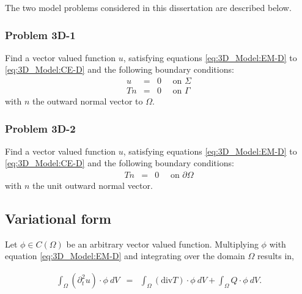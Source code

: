 \documentclass[../../main.tex]{subfiles}ite{VS18}
\begin{document}
The two model problems considered in this dissertation are described below.

\subsubsection{Problem 3D-1}\label{sssec:3D_Model:Problem3D1}
Find a vector valued function $u$, satisfying equations
\eqref{eq:3D_Model:EM-D} to \eqref{eq:3D_Model:CE-D} and the following boundary
conditions:\\

\begin{eqnarray*}
	u & = & 0 \quad \textrm{ on } \Sigma\\
	Tn & = & 0 \quad \textrm{ on } \Gamma
\end{eqnarray*} with $n$ the outward normal vector to $\Omega$.

\subsubsection{Problem 3D-2}\label{sssec:3D_Model:Problem3D2}
Find a vector valued function $u$, satisfying equations
\eqref{eq:3D_Model:EM-D} to \eqref{eq:3D_Model:CE-D} and the following boundary
conditions:\\

\begin{eqnarray*}
	Tn & = & 0 \quad \textrm{ on } \partial\Omega
\end{eqnarray*} with $n$ the unit outward normal vector. \label{sym:boundaryOmega}

\subsection{Variational form}\label{ssec:3D_Model:VariationalForm}
Let $\phi \in C({\Omega})$ be an arbitrary vector valued function. Multiplying
$\phi$ with equation \eqref{eq:3D_Model:EM-D} and integrating over the domain
$\Omega$ results in, \label{sym:Cn} \label{sym:phi}

\begin{eqnarray*}
	\int_{\Omega} (\partial_t^2 u)\cdot \phi \ dV & = & \int_{\Omega} (\textrm{div} T)\cdot \phi \ dV
	+ \int_{\Omega} Q \cdot \phi \ dV.
\end{eqnarray*}
\end{document}
